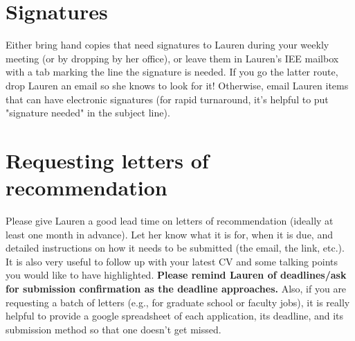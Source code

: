 \documentclass[12pt]{article}
\begin{document}
\section{Signatures}
Either bring hand copies that need signatures to Lauren during your weekly meeting (or by dropping by her office), or leave them in Lauren's IEE mailbox  with a tab marking the line the signature is needed. If you go the latter route, drop Lauren an email so she knows to look for it! Otherwise, email Lauren items that can have electronic signatures (for rapid turnaround, it's helpful to put "signature needed" in the subject line).

\section{Requesting letters of recommendation}
Please give Lauren a good lead time on letters of recommendation (ideally at least one month in advance). Let her know what it is for, when it is due, and detailed instructions on how it needs to be submitted (the email, the link, etc.). It is also very useful to follow up with your latest CV and some talking points you would like to have highlighted. \textbf{Please remind Lauren of deadlines/ask for submission confirmation as the deadline approaches.} Also, if you are requesting a batch of letters (e.g., for graduate school or faculty jobs), it is really helpful to provide a google spreadsheet of each application, its deadline, and its submission method so that one doesn't get missed.
\end{document}
